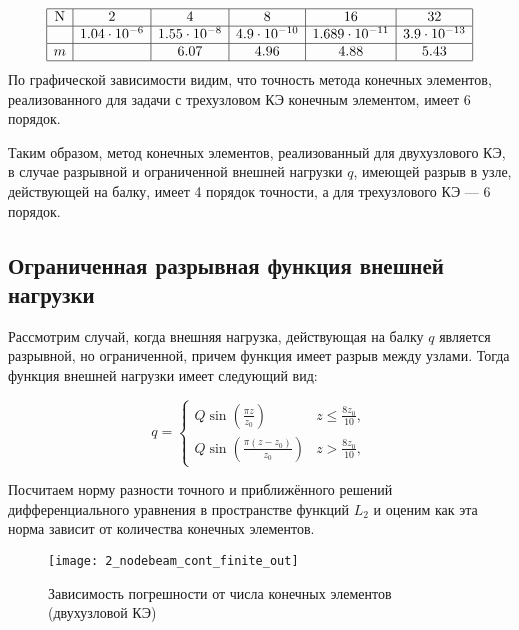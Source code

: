 \documentclass[12pt,a4paper]{article}
\begin{document}
\[
\begin{array}{|c|c|c|c|c|c|}
\hline
\text{N} & 2 & 4 & 8 & 16 & 32 \\ \hline
\Delta  & 1.04 \cdot 10^{-6} & 1.55 \cdot 10^{-8} & 4.9 \cdot 10^{-10} & 1.689 \cdot 10^{-11} & 3.9 \cdot 10^{-13} \\ \hline
m  &  & 6.07 & 4.96 & 4.88 & 5.43 \\ 
\hline
\end{array}
\]
По графической зависимости видим, что точность метода конечных элементов, реализованного для задачи с трехузловом КЭ конечным элементом, имеет 6 порядок. 

Таким образом, метод конечных элементов, реализованный для двухузлового КЭ, в случае разрывной и ограниченной внешней нагрузки $q$, имеющей разрыв в узле, действующей на балку, имеет 4 порядок точности, а для трехузлового КЭ --- 6 порядок. 




\subsection[Ограниченная функция внешней нагрузки с разрывом не в узле]{Ограниченная разрывная функция внешней нагрузки}

Рассмотрим случай, когда внешняя нагрузка, действующая на балку $q$ является разрывной, но ограниченной, причем функция имеет разрыв между узлами. 
Тогда функция внешней нагрузки имеет следующий вид:

\begin{equation}
q = 
 \begin{cases}
	Q \sin \left(\frac{\pi  z}{z_{0}}\right) & z \leq \frac{8 z_{0}}{10}, \\
    Q \sin \left(\frac{\pi  (z-z_{0})}{z_{0}}\right) & z > \frac{8 z_{0}}{10} ,
 \end{cases}
\end{equation}

Посчитаем норму разности точного и приближённого решений дифференциального уравнения в пространстве функций $L_{2}$  и оценим как эта норма зависит от количества конечных элементов.\\

\begin{figure}[H]
		\centering
		\texttt{[image: 2\_nodebeam\_cont\_finite\_out]}
		\caption{Зависимость погрешности от числа конечных элементов (двухузловой КЭ)}
		\label{fig:2_nodebeam_cont_finite_out}
	\end{figure}
\end{document}
